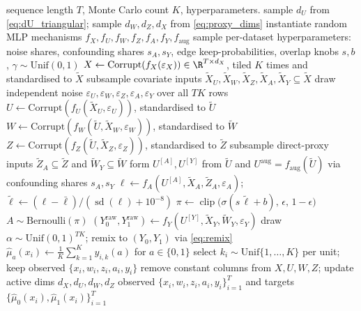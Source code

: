 \begin{algorithm}[t]
\caption{Generation of one proximal dataset.}
\label{alg:prior}
\begin{algorithmic}[1]
\Require sequence length $T$, Monte Carlo count $K$, hyperparameters.
\State sample $d_U$ from \eqref{eq:dU_triangular}; sample $d_W,d_Z,d_X$ from \eqref{eq:proxy_dims}
\State instantiate random MLP mechanisms $f_X,f_U,f_W,f_Z,f_A,f_Y,f_{\mathrm{aug}}$
\State sample per-dataset hyperparameters: noise shares, confounding shares $s_A,s_Y$, edge keep-probabilities, overlap knobs $s,b$, $\gamma\sim\mathrm{Unif}(0,1)$
\Statex\vspace{2pt}
\Repeat
  \State $X \gets \mathrm{Corrupt}(f_X(\varepsilon_X)) \in \R^{T\times d_X}$, tiled $K$ times and standardised to $\tilde X$
  \State subsample covariate inputs $\tilde X_U,\tilde X_W,\tilde X_Z,\tilde X_A,\tilde X_Y\subseteq\tilde X$
  \State draw independent noise $\varepsilon_U,\varepsilon_W,\varepsilon_Z,\varepsilon_A,\varepsilon_Y$ over all $TK$ rows
  \State $U \gets \mathrm{Corrupt}(f_U(\tilde X_U,\varepsilon_U))$, standardised to $\tilde U$
  \State $W \gets \mathrm{Corrupt}(f_W(\tilde U,\tilde X_W,\varepsilon_W))$, standardised to $\tilde W$ 
  \State $Z \gets \mathrm{Corrupt}(f_Z(\tilde U,\tilde X_Z,\varepsilon_Z))$, standardised to $\tilde Z$ 
  \State subsample direct-proxy inputs $\tilde Z_A\subseteq\tilde Z$ and $\tilde W_Y\subseteq\tilde W$
  \State form $U^{[A]},U^{[Y]}$ from $\tilde U$ and $U^{\mathrm{aug}}=f_{\mathrm{aug}}(\tilde U)$ via confounding shares $s_A,s_Y$
  \State $\ell \gets f_A(U^{[A]},\tilde X_A,\tilde Z_A,\varepsilon_A)$;\quad $\tilde\ell \gets (\ell-\bar\ell)/(\operatorname{sd}(\ell)+10^{-8})$
  \State $\pi \gets \operatorname{clip}\big(\sigma(s\,\tilde\ell+b),\,\epsilon,\,1-\epsilon\big)$
  \State $A \sim \mathrm{Bernoulli}(\pi)$
  \State $(Y_0^{\mathrm{raw}},Y_1^{\mathrm{raw}}) \gets f_Y(U^{[Y]},\tilde X_Y,\tilde W_Y,\varepsilon_Y)$
  \State draw $\alpha\sim\mathrm{Unif}(0,1)^{TK}$; remix to $(Y_0,Y_1)$ via \eqref{eq:remix}
  \State $\hat\mu_a(x_i) \gets \tfrac1K\sum_{k=1}^K y_{i,k}(a)$ for $a\in\{0,1\}$
  \State select $k_i\sim\mathrm{Unif}\{1,\dots,K\}$ per unit; keep observed $\{x_i,w_i,z_i,a_i,y_i\}$
  \State remove constant columns from $X,U,W,Z$; update active dims $d_X,d_U,d_W,d_Z$ \label{line:constant_column_filter}
\Statex\vspace{2pt}
\State \Return observed $\{x_i,w_i,z_i,a_i,y_i\}_{i=1}^T$ and targets $\{\hat\mu_0(x_i),\hat\mu_1(x_i)\}_{i=1}^T$
\end{algorithmic}
\end{algorithm}
